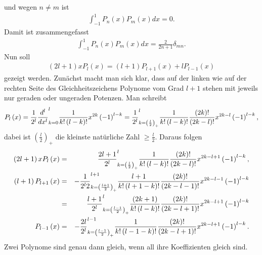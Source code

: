 \documentclass{book}
\let\sum\relax
\DeclareMathOperator*{\sum}{\raisebox{-3.5pt}{\scalebox{2}{\rotatebox{1}{{\bask Σ}}}}}
\begin{document}
%
und wegen $n\not = m$ ist
%
\begin{eqnarray}
\int_{-1}^{1}P_n\left(x\right)P_m\left(x\right)dx = 0.
\end{eqnarray}
%
Damit ist zusammengefasst
%
\begin{eqnarray}
\int_{-1}^{1}P_n\left(x\right)P_m\left(x\right)dx = \frac{2}{2n + 1}\delta_{mn}.
\end{eqnarray}
%
Nun soll
%
\begin{eqnarray}
\left(2l + 1\right)xP_l\left(x\right) = \left(l + 1\right)P_{l + 1}\left(x\right) + lP_{l - 1}\left(x\right)\label{eq:legendre_poly_prop_1}
\end{eqnarray}
%
gezeigt werden. Zunächst macht man sich klar, dass auf der linken wie auf der rechten Seite des Gleichheitszeichens Polynome vom Grad $l + 1$ stehen mit jeweils nur geraden oder ungeraden Potenzen. Man schreibt
%
\begin{eqnarray}
P_l\left(x\right) = \frac{1}{2^l}\frac{d^l}{dx^l}\sum_{k = 0}^{l}\frac{1}{k!\left(l - k\right)!}x^{2k}\left(-1\right)^{l - k} = \frac{1}{2^l}\sum_{k = \left(\frac{l}{2}\right)_ + }^{l}\frac{1}{k!\left(l - k\right)!}\frac{\left(2k\right)!}{\left(2k - l\right)!}x^{2k - l}\left(-1\right)^{l - k}, 
\end{eqnarray}
%
dabei ist $\left(\frac{l}{2}\right)_ + $ die kleinste natürliche Zahl $\geq\frac{l}{2}$. Daraus folgen
%
\begin{eqnarray}
\left(2l + 1\right)xP_l\left(x\right) & = & \frac{2l + 1}{2^l}\sum_{k = \left(\frac{l}{2}\right)_ + }^{l}\frac{1}{k!\left(l - k\right)!}\frac{\left(2k\right)!}{\left(2k - l\right)!}x^{2k - l + 1}\left(-1\right)^{l - k},\\
\left(l + 1\right)P_{l + 1}\left(x\right) & = & -\frac{1}{2^l2}\sum_{k = \left(\frac{l + 1}{2}\right)_ + }^{l + 1}\frac{l + 1}{k!\left(l + 1 - k\right)!}\frac{\left(2k\right)!}{\left(2k - l - 1\right)!}x^{2k - l - 1}\left(-1\right)^{l - k}\\
& = & \frac{l + 1}{2^l}\sum_{k = \left(\frac{l - 1}{2}\right)_ + }^{l}\frac{\left(2k + 1\right)}{k!\left(l - k\right)!}\frac{\left(2k\right)!}{\left(2k - l + 1\right)!}x^{2k - l + 1}\left(-1\right)^{l - k}\\
P_{l - 1}\left(x\right) & = & -\frac{2l}{2^l}\sum_{k = \left(\frac{l - 1}{2}\right)_ + }^{l - 1}\frac{1}{k!\left(l - 1 - k\right)!}\frac{\left(2k\right)!}{\left(2k - l + 1\right)!}x^{2k - l + 1}\left(-1\right)^{l - k}.
\end{eqnarray}
%
Zwei Polynome sind genau dann gleich, wenn all ihre Koeffizienten gleich sind.
\end{document}

